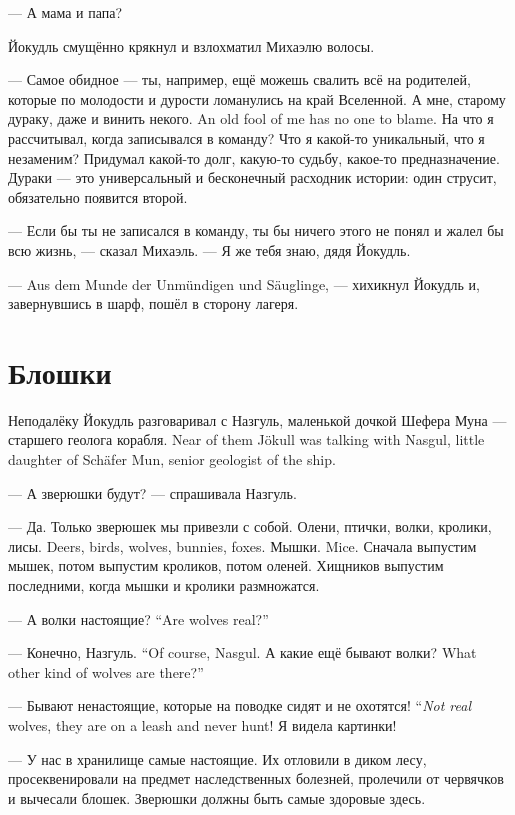 --- А мама и папа?

Йокудль смущённо крякнул и взлохматил Михаэлю волосы.

--- Самое обидное --- ты, например, ещё можешь свалить всё на родителей, которые по молодости и дурости ломанулись на край Вселенной.
{А мне, старому дураку, даже и винить некого.}
{An old fool of me has no one to blame.}
На что я рассчитывал, когда записывался в команду?
Что я какой-то уникальный, что я незаменим?
Придумал какой-то долг, какую-то судьбу, какое-то предназначение.
Дураки --- это универсальный и бесконечный расходник истории: один струсит, обязательно появится второй.

--- Если бы ты не записался в команду, ты бы ничего этого не понял и жалел бы всю жизнь, --- сказал Михаэль.
--- Я же тебя знаю, дядя Йокудль.

--- Aus dem Munde der Unmündigen und Säuglinge, --- хихикнул Йокудль и, завернувшись в шарф, пошёл в сторону лагеря.

\section{Блошки}

{Неподалёку Йокудль разговаривал с Назгуль, маленькой дочкой Шефера Муна --- старшего геолога корабля.}
{Near of them Jökull was talking with Nasgul, little daughter of Schäfer Mun, senior geologist of the ship.}

--- А зверюшки будут? --- спрашивала Назгуль.

--- Да.
Только зверюшек мы привезли с собой.
{Олени, птички, волки, кролики, лисы.}
{Deers, birds, wolves, bunnies, foxes.}
{Мышки.}
{Mice.}
Сначала выпустим мышек, потом выпустим кроликов, потом оленей.
Хищников выпустим последними, когда мышки и кролики размножатся.

{--- А волки настоящие?}
{``Are wolves real?''}

{--- Конечно, Назгуль.}
{``Of course, Nasgul.}
{А какие ещё бывают волки?}
{What other kind of wolves are there?''}

{--- Бывают ненастоящие, которые на поводке сидят и не охотятся!}
{``\emph{Not real} wolves, they are on a leash and never hunt!}
Я видела картинки!

--- У нас в хранилище самые настоящие.
Их отловили в диком лесу, просеквенировали на предмет наследственных болезней, пролечили от червячков и вычесали блошек.
Зверюшки должны быть самые здоровые здесь.

